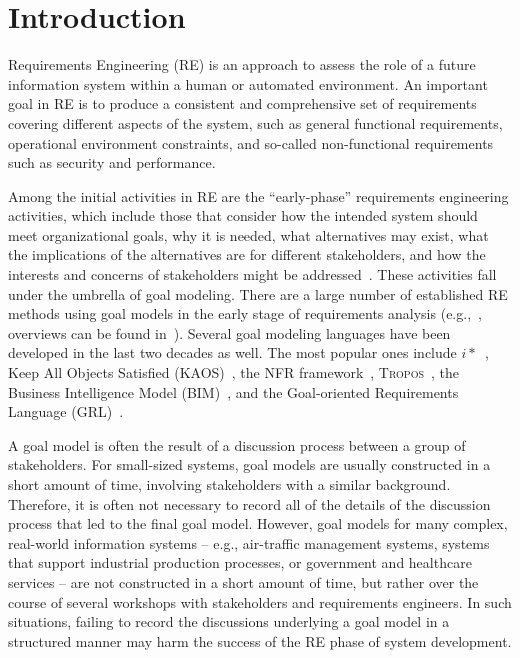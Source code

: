\section{Introduction}
\label{sect:introduction}

Requirements Engineering (RE) is an approach to assess the role of a future information system within a human or automated environment. An important goal in RE is to produce a consistent and comprehensive set of requirements covering different aspects of the system, such as general functional requirements, operational environment constraints, and so-called non-functional requirements such as security and performance. 

Among the initial activities in RE are the ``early-phase'' requirements engineering activities, which include those that consider how the intended system should meet organizational goals, why it is needed, what alternatives may exist, what the implications of the alternatives are for different stakeholders, and how the interests and concerns of stakeholders might be addressed~\cite{yu1997towards}. These activities fall under the umbrella of goal modeling. There are a large number of established RE methods using goal models in the early stage of requirements analysis (e.g.,~\cite{liu2004designing,donzelli2004goal,dardenne1993goal,chung2012non,castro2002towards}, overviews can be found in~\cite{van2001goal,kavakliL05}). Several goal modeling languages have been developed in the last two decades as well. The most popular ones include $i*$~\cite{Yu:1997:TMR:827255.827807}, Keep All Objects Satisfied (KAOS)~\cite{van2008requirements}, the NFR framework~\cite{chung2012non}, \textsc{Tropos}~\cite{giorgini2005goal}, the Business Intelligence Model (BIM)~\cite{horkoff2014strategic}, and the Goal-oriented Requirements Language (GRL)~\cite{Amyot:2010:EGM:1841349.1841356}.

A goal model is often the result of a discussion process between a group of stakeholders. For small-sized systems, goal models are usually constructed in a short amount of time, involving stakeholders with a similar background. Therefore, it is often not necessary to record all of the details of the discussion process that led to the final goal model. However, goal models for many complex, real-world information systems -- e.g., air-traffic management systems, systems that support industrial production processes, or government and healthcare services -- are not constructed in a short amount of time, but rather over the course of several workshops with stakeholders and requirements engineers. In such situations, failing to record the discussions underlying a goal model in a structured manner may harm the success of the RE phase of system development. 

